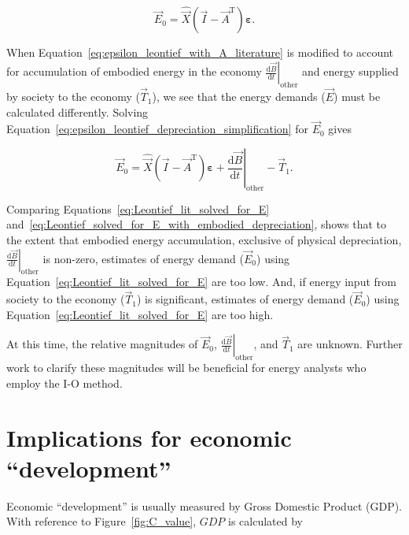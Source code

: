 \begin{equation} \label{eq:Leontief_lit_solved_for_E}
	\vec{E}_{0} 
	= \hat{\vec{X}}(\vec{I} - \vec{A}^{\mathrm{T}})\bm{\varepsilon}.
\end{equation}

When Equation~\ref{eq:epsilon_leontief_with_A_literature}
is modified to account for accumulation of embodied energy 
in the economy 
$\left. \frac{\mathrm{d}\vec{B}}{\mathrm{d}t} \right|_{\mathrm{other}}$
and energy supplied by society to the economy ($\vec{T}_{1}$),
we see that the energy demands ($\vec{E}$) must be calculated differently. 
Solving Equation~\ref{eq:epsilon_leontief_depreciation_simplification} 
for $\vec{E}_{0}$ gives 

\begin{equation} \label{eq:Leontief_solved_for_E_with_embodied_depreciation}
	\vec{E}_{0} 
	= \hat{\vec{X}}
		(\vec{I} - \vec{A}^{\mathrm{T}})
		\bm{\varepsilon} 
	+ \left. \frac{\mathrm{d}\vec{B}}{\mathrm{d}t} \right|_{\mathrm{other}}
	- \vec{T}_{1}.
\end{equation}

\noindent{}Comparing Equations~\ref{eq:Leontief_lit_solved_for_E} 
and~\ref{eq:Leontief_solved_for_E_with_embodied_depreciation}, 
shows that to the extent that embodied energy accumulation,
exclusive of physical depreciation,
$\left. \frac{\mathrm{d}\vec{B}}{\mathrm{d}t} \right|_{\mathrm{other}}$
is non-zero, estimates of energy demand ($\vec{E}_{0}$) using 
Equation~\ref{eq:Leontief_lit_solved_for_E} are too low. 
And, if energy input from society to the economy ($\vec{T}_{1}$) is significant,
estimates of energy demand ($\vec{E}_{0}$) using 
Equation~\ref{eq:Leontief_lit_solved_for_E} are too high. 

At this time, the relative magnitudes of $\vec{E}_{0}$,
$\left. \frac{\mathrm{d}\vec{B}}{\mathrm{d}t} \right|_{\mathrm{other}}$,
and $\vec{T}_{1}$ are unknown. 
Further work to clarify these magnitudes will be beneficial
for energy analysts who employ the I-O method.


\section{Implications for economic ``development''}
\label{sec:implications_for_development}

Economic ``development'' is usually measured 
by Gross Domestic Product (GDP).
With reference to Figure~\ref{fig:C_value}, $GDP$ is calculated by

